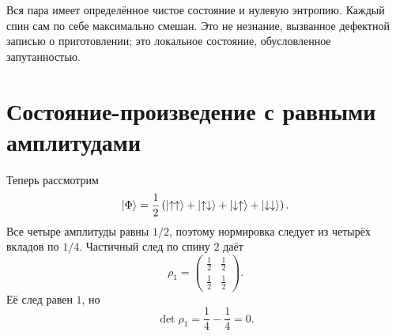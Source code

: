 Вся пара имеет определённое чистое состояние и нулевую энтропию. Каждый спин сам по себе максимально смешан. Это не незнание, вызванное дефектной записью о приготовлении; это локальное состояние, обусловленное запутанностью.

\section{Состояние-произведение с равными амплитудами}

Теперь рассмотрим
\begin{equation}
\left\lvert\Phi\right\rangle
=\frac12\left(
\left\lvert\uparrow\uparrow\right\rangle
+\left\lvert\uparrow\downarrow\right\rangle
+\left\lvert\downarrow\uparrow\right\rangle
+\left\lvert\downarrow\downarrow\right\rangle
\right).
\end{equation}
Все четыре амплитуды равны \(1/2\), поэтому нормировка следует из четырёх вкладов по \(1/4\). Частичный след по спину \(2\) даёт
\begin{equation}
\rho_1
=
\begin{pmatrix}
\frac12&\frac12\\[2pt]
\frac12&\frac12
\end{pmatrix}.
\end{equation}
Её след равен \(1\), но
\begin{equation}
\det\rho_1
=\frac14-\frac14
=0.
\end{equation}

\begin{classroomqa}
\end{classroomqa}

\begin{classroomqa}
\end{classroomqa}

